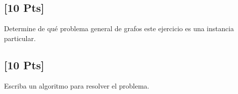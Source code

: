 \subsection{[10 Pts]} Determine de qué problema general de grafos este ejercicio
es una instancia particular.

\subsection{[10 Pts]} Escriba un algoritmo para resolver el problema.



